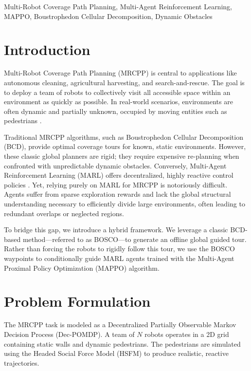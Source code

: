 \documentclass[conference]{IEEEtran}
\begin{document}
\begin{IEEEkeywords}
Multi-Robot Coverage Path Planning, Multi-Agent Reinforcement Learning, MAPPO, Boustrophedon Cellular Decomposition, Dynamic Obstacles
\end{IEEEkeywords}

\section{Introduction}
Multi-Robot Coverage Path Planning (MRCPP) is central to applications like autonomous cleaning, agricultural harvesting, and search-and-rescue. The goal is to deploy a team of robots to collectively visit all accessible space within an environment as quickly as possible. In real-world scenarios, environments are often dynamic and partially unknown, occupied by moving entities such as pedestrians \cite{choset2001coverage}.

Traditional MRCPP algorithms, such as Boustrophedon Cellular Decomposition (BCD), provide optimal coverage tours for known, static environments. However, these classic global planners are rigid; they require expensive re-planning when confronted with unpredictable dynamic obstacles. Conversely, Multi-Agent Reinforcement Learning (MARL) offers decentralized, highly reactive control policies \cite{yu2022surprising}. Yet, relying purely on MARL for MRCPP is notoriously difficult. Agents suffer from sparse exploration rewards and lack the global structural understanding necessary to efficiently divide large environments, often leading to redundant overlaps or neglected regions.

To bridge this gap, we introduce a hybrid framework. We leverage a classic BCD-based method—referred to as BOSCO—to generate an offline global guided tour. Rather than forcing the robots to rigidly follow this tour, we use the BOSCO waypoints to conditionally guide MARL agents trained with the Multi-Agent Proximal Policy Optimization (MAPPO) algorithm.

\section{Problem Formulation}
The MRCPP task is modeled as a Decentralized Partially Observable Markov Decision Process (Dec-POMDP). A team of $N$ robots operates in a 2D grid containing static walls and dynamic pedestrians. The pedestrians are simulated using the Headed Social Force Model (HSFM) to produce realistic, reactive trajectories.
\end{document}

